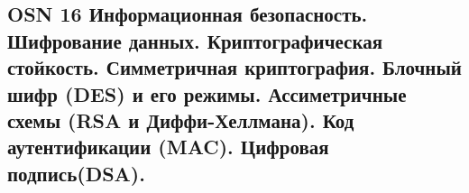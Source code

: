 \subsection{OSN 16 Информационная безопасность. Шифрование данных. Криптографическая стойкость. Симметричная криптография. Блочный шифр
(DES) и его режимы. Ассиметричные схемы (RSA и Диффи-Хеллмана). Код аутентификации (MAC). Цифровая подпись(DSA).}

